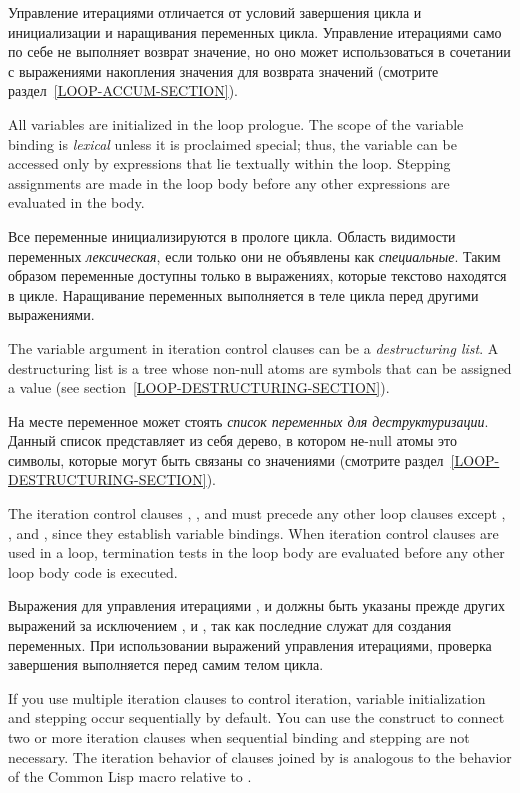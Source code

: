 Управление итерациями отличается от условий завершения цикла и
инициализации и наращивания переменных цикла. Управление итерациями
само по себе не выполняет возврат значение, но оно может
использоваться в сочетании с выражениями накопления значения для
возврата значений (смотрите раздел~\ref{LOOP-ACCUM-SECTION}).

All variables are initialized in the loop prologue.  The scope of
the variable binding is \emph{lexical} unless it is proclaimed
special; thus, the variable can be
accessed only by expressions that lie textually within the loop.
Stepping assignments are made in the loop body before any other expressions
are evaluated in the body.

Все переменные инициализируются в прологе цикла. Область видимости
переменных \emph{лексическая}, если только они не объявлены как
\emph{специальные}. Таким образом переменные доступны только в
выражениях, которые текстово находятся в цикле. Наращивание переменных
выполняется в теле цикла перед другими выражениями.

The variable argument in iteration control clauses can be a 
\emph{destructuring list}.  A destructuring list
is a tree whose non-null atoms are symbols that
can be assigned a value (see section~\ref{LOOP-DESTRUCTURING-SECTION}).

На месте переменное может стоять \emph{список переменных для
  деструктуризации}. Данный список представляет из себя дерево, в
котором не-null атомы это символы, которые могут быть связаны со
значениями (смотрите раздел~\ref{LOOP-DESTRUCTURING-SECTION}).

The iteration control clauses , , and  
must precede any other loop clauses except
, , and ,
since they establish variable bindings.  When iteration control clauses are
used in a loop, termination tests in the loop body are evaluated
before any other loop body code is executed.

Выражения для управления итерациями ,  и 
должны быть указаны прежде других выражений за исключением
,  и , так как последние служат
для создания переменных. При использовании выражений управления
итерациями, проверка завершения выполняется перед самим телом цикла.

If you use multiple iteration clauses to control iteration, variable
initialization and stepping occur sequentially by default.  
You can use the  construct to connect two or more
iteration clauses when sequential binding and stepping are not necessary.
The iteration behavior of clauses joined by 
is analogous to the behavior of the Common Lisp macro 
relative to .

